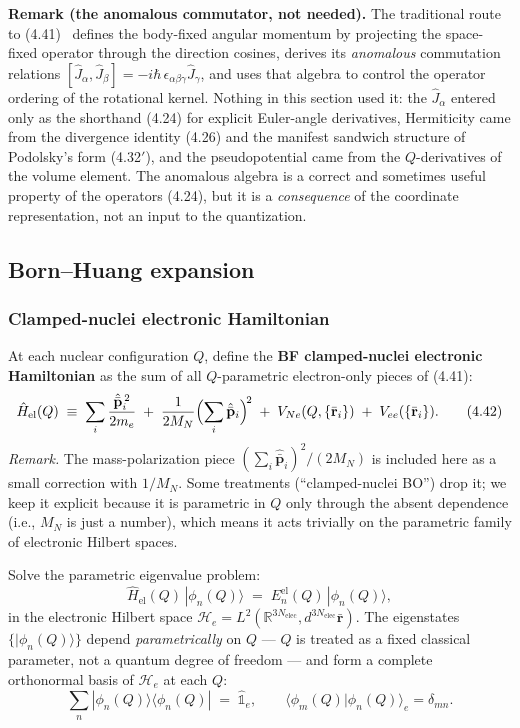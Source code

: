 \medskip
\noindent\textbf{Remark (the anomalous commutator, not needed).} The traditional route to (4.41)~\cite{klein1929,vanvleck1951,bunkerjensen} defines the body-fixed angular momentum by projecting the space-fixed operator through the direction cosines, derives its \emph{anomalous} commutation relations $[\hat J_\alpha,\hat J_\beta]=-i\hbar\,\epsilon_{\alpha\beta\gamma}\hat J_\gamma$, and uses that algebra to control the operator ordering of the rotational kernel. Nothing in this section used it: the $\hat J_\alpha$ entered only as the shorthand (4.24) for explicit Euler-angle derivatives, Hermiticity came from the divergence identity (4.26) and the manifest sandwich structure of Podolsky's form (4.32$'$), and the pseudopotential came from the $Q$-derivatives of the volume element. The anomalous algebra is a correct and sometimes useful property of the operators (4.24), but it is a \emph{consequence} of the coordinate representation, not an input to the quantization.

\subsection{Born--Huang expansion}

\subsubsection{Clamped-nuclei electronic Hamiltonian}

At each nuclear configuration $Q$, define the \textbf{BF clamped-nuclei electronic Hamiltonian} as the sum of all $Q$-parametric electron-only pieces of (4.41):
\begin{equation}
\hat H_{\mathrm{el}}(Q) \;\equiv\; \sum_i\frac{\hat{\bar{\mathbf{p}}}_i^{\,2}}{2m_e} \;+\; \frac{1}{2M_N}\Bigl(\sum_i\hat{\bar{\mathbf{p}}}_i\Bigr)^{\!2} \;+\; V_{Ne}(Q,\{\bar{\mathbf{r}}_i\}) \;+\; V_{ee}(\{\bar{\mathbf{r}}_i\}). \tag{4.42}
\end{equation}
\emph{Remark.} The mass-polarization piece $(\sum_i\hat{\bar{\mathbf{p}}}_i)^{2}/(2M_N)$ is included here as a small correction with $1/M_N$. Some treatments (``clamped-nuclei BO'') drop it; we keep it explicit because it is parametric in $Q$ only through the absent dependence (i.e., $M_N$ is just a number), which means it acts trivially on the parametric family of electronic Hilbert spaces.

Solve the parametric eigenvalue problem:
\begin{equation}
\hat H_{\mathrm{el}}(Q)\,|\phi_n(Q)\rangle \;=\; E_n^{\mathrm{el}}(Q)\,|\phi_n(Q)\rangle, \tag{4.43}
\end{equation}
in the electronic Hilbert space $\mathcal{H}_e = L^{2}(\mathbb{R}^{3N_{\mathrm{elec}}},d^{3N_{\mathrm{elec}}}\bar{\mathbf{r}})$. The eigenstates $\{|\phi_n(Q)\rangle\}$ depend \emph{parametrically} on $Q$ --- $Q$ is treated as a fixed classical parameter, not a quantum degree of freedom --- and form a complete orthonormal basis of $\mathcal{H}_e$ at each $Q$:
\begin{equation}
\sum_n |\phi_n(Q)\rangle\langle\phi_n(Q)| \;=\; \hat{\mathbb{1}}_{e},\qquad \langle\phi_m(Q)|\phi_n(Q)\rangle_e = \delta_{mn}. \tag{4.44}
\end{equation}

